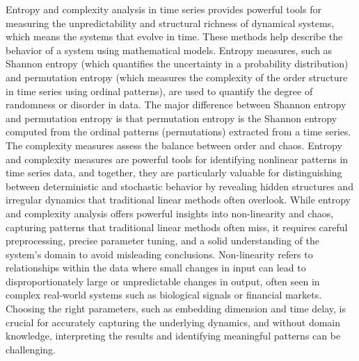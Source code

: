 Entropy and complexity analysis in time series provides powerful tools for measuring the unpredictability and structural richness of dynamical systems, which means the systems that evolve in time. 
These methods help describe the behavior of a system using mathematical models. 
Entropy measures, such as Shannon entropy (which quantifies the uncertainty in a probability distribution) and permutation entropy (which measures the complexity of the order structure in time series using ordinal patterns), are used to quantify the degree of randomness or disorder in data. 
The major difference between Shannon entropy and permutation entropy is that permutation entropy is the Shannon entropy computed from the ordinal patterns (permutations) extracted from a time series.
The complexity measures assess the balance between order and chaos.  
Entropy and complexity measures are powerful tools for identifying nonlinear patterns in time series data, and together, they are particularly valuable for distinguishing between deterministic and stochastic behavior by revealing hidden structures and irregular dynamics that traditional linear methods often overlook.
While entropy and complexity analysis offers powerful insights into non-linearity and chaos, capturing patterns that traditional linear methods often miss, it requires careful preprocessing, precise parameter tuning, and a solid understanding of the system's domain to avoid misleading conclusions. Non-linearity refers to relationships within the data where small changes in input can lead to disproportionately large or unpredictable changes in output, often seen in complex real-world systems such as biological signals or financial markets. Choosing the right parameters, such as embedding dimension and time delay, is crucial for accurately capturing the underlying dynamics, and without domain knowledge, interpreting the results and identifying meaningful patterns can be challenging.
